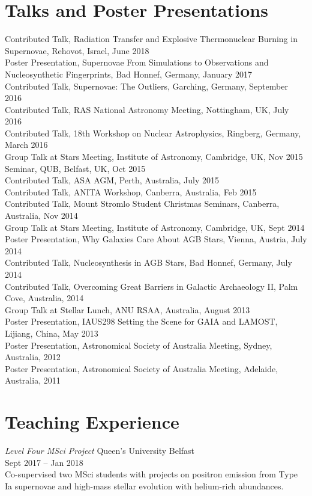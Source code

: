 \documentclass[11pt]{res} %
\begin{document}
\begin{resume}
\section{Talks and Poster Presentations}
  Contributed Talk, Radiation Transfer and Explosive Thermonuclear Burning in Supernovae, Rehovot, Israel, June 2018\\
  Poster Presentation, Supernovae From Simulations to Observations and Nucleosynthetic Fingerprints, Bad Honnef, Germany, January 2017\\
  Contributed Talk, Supernovae: The Outliers, Garching, Germany, September 2016\\
  Contributed Talk, RAS National Astronomy Meeting, Nottingham, UK, July 2016\\
  Contributed Talk, 18th Workshop on Nuclear Astrophysics, Ringberg, Germany, March 2016\\
  Group Talk at Stars Meeting, Institute of Astronomy, Cambridge, UK, Nov 2015\\
  Seminar, QUB, Belfast, UK, Oct 2015\\
  Contributed Talk, ASA AGM, Perth, Australia, July 2015\\
  Contributed Talk, ANITA Workshop, Canberra, Australia, Feb 2015\\
  Contributed Talk, Mount Stromlo Student Christmas Seminars, Canberra, Australia, Nov 2014\\
  Group Talk at Stars Meeting, Institute of Astronomy, Cambridge, UK, Sept 2014\\
  Poster Presentation, Why Galaxies Care About AGB Stars, Vienna, Austria, July 2014\\
  Contributed Talk, Nucleosynthesis in AGB Stars, Bad Honnef, Germany, July 2014\\
  Contributed Talk, Overcoming Great Barriers in Galactic Archaeology II, Palm Cove, Australia, 2014\\
  Group Talk at Stellar Lunch, ANU RSAA, Australia, August 2013\\
  Poster Presentation, IAUS298 Setting the Scene for GAIA and LAMOST, Lijiang, China, May 2013\\
  Poster Presentation, Astronomical Society of Australia Meeting, Sydney, Australia, 2012\\
  Poster Presentation, Astronomical Society of Australia Meeting, Adelaide, Australia, 2011

\section{Teaching Experience}
  {\it Level Four MSci Project} \hfill Queen's University Belfast\\
  \null\hfill Sept 2017 -- Jan 2018\\
  Co-supervised two MSci students with projects on positron emission from Type Ia supernovae
  and high-mass stellar evolution with helium-rich abundances.\\


\end{resume}
\end{document}
